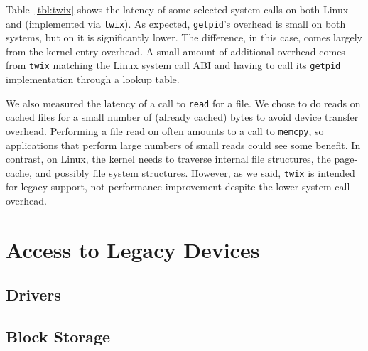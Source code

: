 {    Table~\ref{tbl:twix} shows the latency of some selected system calls on both Linux and \Twizzler
    (implemented via \texttt{twix}). As expected, \texttt{getpid}'s overhead is small on both systems,
    but on \Twizzler it is significantly lower. The difference, in this case, comes largely from the
    kernel entry overhead. A small amount of additional overhead comes from
    \texttt{twix} matching the Linux system call ABI and having to call its \texttt{getpid}
    implementation through a lookup table.

    We also measured the latency of a call to \texttt{read} for a file. We chose to do reads on cached
    files for a small number of (already cached) bytes to avoid device transfer overhead. Performing a file read on
    \Twizzler often amounts to a call to \texttt{memcpy}, so applications that perform large numbers of
    small reads could see some benefit. In contrast, on Linux, the kernel needs to traverse internal
    file structures, the page-cache, and possibly file system structures.
    However, as we said, \texttt{twix} is intended for legacy
    support, not performance improvement despite the lower system call overhead.
}

\section{Access to Legacy Devices}

\subsection{Drivers}

\subsection{Block Storage}